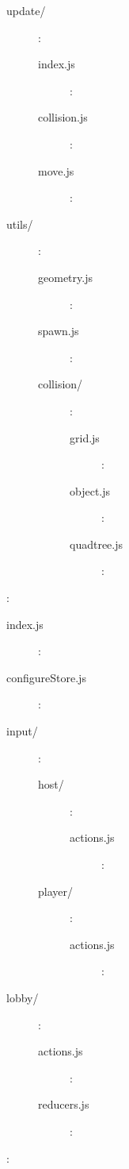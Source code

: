 \documentclass{standalone}
\begin{document}
\begin{formal}
\begin{description}
\begin{description}
\begin{description}
			      		\item[update/]:
				      	\begin{description}
			      			\item[index.js]:
			      			\item[collision.js]:
			      			\item[move.js]:
			      		\end{description}

			      		\item[utils/]:
				      	\begin{description}
			      			\item[geometry.js]:
			      			\item[spawn.js]:

			      			\item[collision/]:
				      		\begin{description}
				      			\item[grid.js]:
				      			\item[object.js]:
				      			\item[quadtree.js]:
				    			\end{description}
			      		\end{description}
					    \end{description}

					    \item[state]:
					    	\begin{description}
			      			\item[index.js]:
			      			\item[configureStore.js]:


			      			\item[input/]:
					    		\begin{description}
				      			\item[host/]:
						    		\begin{description}
				      				\item[actions.js]:
			    					\end{description}

				      			\item[player/]:
						    		\begin{description}
				      				\item[actions.js]:
			    					\end{description}
			    				\end{description}

			    				\item[lobby/]:
					    		\begin{description}
				      			\item[actions.js]:
				      			\item[reducers.js]:
			    				\end{description}
			    			\end{description}

					    \item[utils]:
		      	\end{description}
	    \end{description}
    \end{formal}
\end{document}
